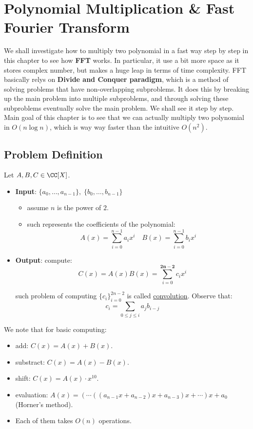 \chapter{Polynomial Multiplication \& Fast Fourier Transform}

We shall investigate how to multiply two polynomial in a fast way step by step in this chapter to see how \textbf{FFT} works. In particular, it use a bit more space as it stores complex number, but makes a huge leap in terms of time complexity. FFT basically relys on \textbf{Divide and Conquer paradigm}, which is a method of solving problems that have non-overlapping subproblems. It does this by breaking up the main problem into multiple subproblems, and through solving these subproblems eventually solve the main problem. We shall see it step by step. Main goal of this chapter is to see that we can actually multiply two polynomial in \( O(n\log n) \), which is way way faster than the intuitive \( O(n^2) \).

\section{Problem Definition}

\begin{problem}
Let \( A, B, C \in \CC[X] \).
\begin{itemize}
	\item \textbf{Input}: \( \{a_0, \ldots, a_{n-1}\}, \; \{b_0, \ldots, b_{n-1}\} \)
	      \begin{itemize}
		      \item assume \( n \) is the power of \( 2 \).
		      \item such represents the coefficients of the polynomial:
		            \[
			            A(x)= \sum_{i=0}^{n-1}a_i x^i \quad B(x) = \sum_{i=0}^{n-1}b_i x^i
		            \]
	      \end{itemize}
	\item \textbf{Output}: compute:
	      \[
		      C(x) = A(x)B(x) = \sum_{i=0}^{\mathbf{2n-2}}c_i x^i
	      \]

	      such problem of computing \( \{c_i\}_{i=0}^{2n-2} \) is called \underline{convolution}. Observe that:
	      \[
		      c_i = \sum_{0\leq j \leq i} a_j b_{i-j}
	      \]
\end{itemize}
\end{problem}

We note that for basic computing:
\begin{itemize}
	\item add: $C(x) = A(x) + B(x)$.
	\item substract: \( C(x) = A(x) - B(x) \).
	\item shift: \( C(x) = A(x) \cdot x^{10} \).
	\item evaluation: $A(x) = (\cdots((a_{n-1}x + a_{n-2})x + a_{n-3})x + \cdots ) x + a_0$ (Horner's method).
	\item Each of them takes \( O(n) \) operations.
\end{itemize}

